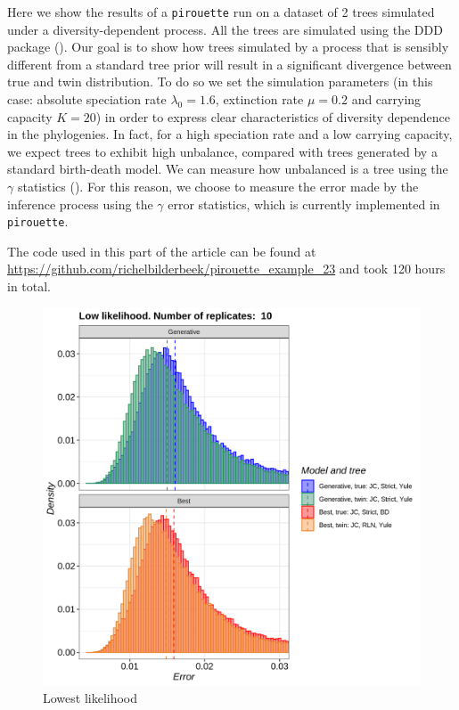 Here we show the results of a \verb;pirouette; run on a dataset 
of 2 trees simulated under a diversity-dependent process. 
All the trees are simulated using the DDD package (\cite{DDD}). 
Our goal is to show how trees simulated by a process that is 
sensibly different from a standard tree prior will result in a 
significant divergence between true and twin distribution. 
To do so we set the simulation parameters (in this case: 
absolute speciation rate $\lambda_0 = 1.6$, 
extinction rate $\mu = 0.2$ and carrying capacity $K = 20$) 
in order to express clear characteristics of diversity dependence in the 
phylogenies. In fact, for a high speciation rate and a low carrying capacity, 
we expect trees to exhibit high unbalance, compared with trees generated 
by a standard birth-death model. 
We can measure how unbalanced is a tree using the $\gamma$ 
statistics (\cite{pybus2000testing}). For this reason, we choose to 
measure the error made by the inference process using the $\gamma$ error statistics, 
which is currently implemented in \verb;pirouette;.

The code used in this part of the article can be found at 
\url{https://github.com/richelbilderbeek/pirouette_example_23}
and took 120 hours in total.

\begin{figure}[H]
  \includegraphics[width=\textwidth]{pirouette_example_23/errors_low.png}
  \caption{Lowest likelihood}
\end{figure}


